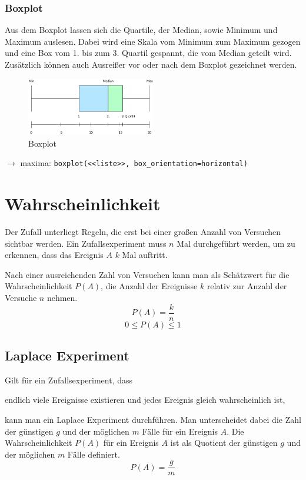 \documentclass{school}
\begin{document}
\subsubsection{Boxplot}
Aus dem Boxplot lassen sich die Quartile, der Median, sowie Minimum und Maximum auslesen. Dabei wird eine Skala vom Minimum zum Maximum gezogen und eine Box vom 1. bis zum 3. Quartil gespannt, die vom Median geteilt wird. Zusätzlich können auch Ausreißer vor oder nach dem Boxplot gezeichnet werden.
\begin{figure}[h]
	\centering
	\includegraphics[width=0.5\textwidth]{boxplot.png}
	\caption{Boxplot}
\end{figure}

{\footnotesize $\to$ maxima: \verb|boxplot(<<liste>>, box_orientation=horizontal)|}

\newpage
\section{Wahrscheinlichkeit}
Der Zufall unterliegt Regeln, die erst bei einer großen Anzahl von Versuchen sichtbar werden.
Ein Zufallsexperiment muss $n$ Mal durchgeführt werden, um zu erkennen, dass das Ereignis $A$ $k$ Mal auftritt.

Nach einer ausreichenden Zahl von Versuchen kann man als Schätzwert für die Wahrscheinlichkeit $P(A)$, die Anzahl der Ereignisse $k$ relativ zur Anzahl der Versuche $n$ nehmen.
$$P(A) = \frac{k}{n}$$
{\footnotesize $$0 \leqslant P(A) \leqslant 1$$}
\begin{vardefs}
\end{vardefs}

\subsection{Laplace Experiment}
Gilt für ein Zufallsexperiment, dass
\begin{outline}
\1 endlich viele Ereignisse existieren und
\1 jedes Ereignis gleich wahrscheinlich ist,
\end{outline}
kann man ein Laplace Experiment durchführen. Man unterscheidet dabei die Zahl der günstigen $g$ und der möglichen $m$ Fälle für ein Ereignis $A$. Die Wahrscheinlichkeit $P(A)$ für ein Ereignis $A$ ist als Quotient der günstigen $g$ und der möglichen $m$ Fälle definiert.
$$P(A) = \frac{g}{m}$$
\end{document}
